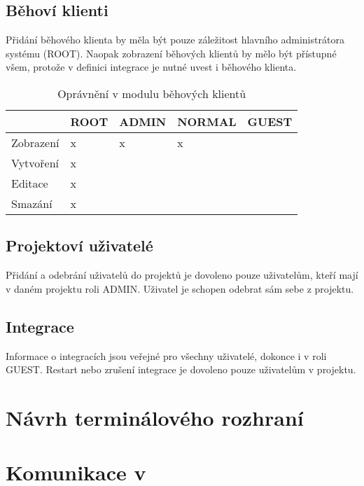 \subsection{Běhoví klienti}

Přidání běhového klienta by měla být pouze záležitost hlavního administrátora systému (ROOT).
Naopak zobrazení běhových klientů by mělo být přístupné všem, protože v definici integrace je nutné uvest i běhového klienta.

\begin{table}[h]
\centering
\caption{Oprávnění v modulu běhových klientů}
\begin{tabular}{|l|l|l|l|l|}
\hline
       & ROOT & ADMIN & NORMAL & GUEST \\ \hline
Zobrazení   & x    & x     & x      &       \\ \hline
Vytvoření & x    &       &        &       \\ \hline
Editace   & x    &       &        &       \\ \hline
Smazání & x    &       &        &      \\ \hline
\end{tabular}
\end{table}

\subsection{Projektoví uživatelé}

Přidání a odebrání uživatelů do projektů je dovoleno pouze uživatelům, kteří mají v daném projektu roli ADMIN.
Uživatel je schopen odebrat sám sebe z projektu.

\subsection{Integrace}

Informace o integracích jsou veřejné pro všechny uživatelé, dokonce i v roli GUEST.
Restart nebo zrušení integrace je dovoleno pouze uživatelům v projektu.

\section{Návrh terminálového rozhraní}

\section{Komunikace v }

